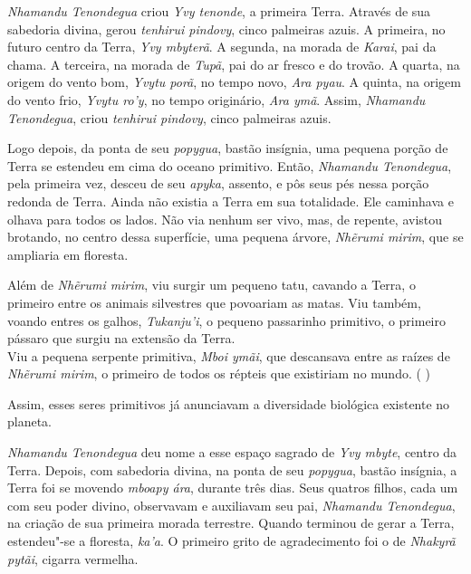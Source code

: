 

 

 



\emph{Nhamandu Tenondegua} criou \emph{Yvy tenonde}, a primeira Terra.
Através de sua sabedoria divina, gerou \emph{tenhirui pindovy}, cinco
palmeiras azuis. A primeira, no futuro centro da Terra, \emph{Yvy
mbyterã}. A segunda, na morada de \emph{Karai}, pai da chama. A terceira, na morada de \emph{Tupã}, pai do ar fresco e do trovão. A quarta, na origem do vento bom, \emph{Yvytu porã}, no tempo novo,
\emph{Ara pyau}. A quinta, na origem do vento frio, \emph{Yvytu ro'y},
no tempo originário, \emph{Ara ymã}. Assim, \emph{Nhamandu Tenondegua},
criou \emph{tenhirui pindovy}, cinco palmeiras azuis{.}

Logo depois, da ponta de seu \emph{popygua}, bastão insígnia, uma
pequena porção de Terra se estendeu em cima do oceano primitivo. Então,
\emph{Nhamandu Tenondegua}, pela primeira vez, desceu de seu
\emph{apyka}, assento, e pôs seus pés nessa porção redonda de Terra.
Ainda não existia a Terra em sua totalidade. Ele caminhava e olhava para
todos os lados. Não via nenhum ser vivo, mas, de repente, avistou
brotando, no centro dessa superfície, uma pequena árvore, \emph{Nhẽrumi
mirim}, que se ampliaria em floresta.




Além de \emph{Nhẽrumi mirim}, viu surgir um pequeno tatu, cavando a
Terra, o primeiro entre os animais silvestres que povoariam as matas.
Viu também, voando entres os galhos, \emph{Tukanju'i}, o pequeno
passarinho primitivo, o primeiro pássaro que surgiu na extensão da
Terra.\\ Viu a pequena serpente primitiva, \emph{Mboi ymãi}, que
descansava entre as raízes de \emph{Nhẽrumi mirim}, o primeiro de todos
os répteis que existiriam no mundo. %
( )

 

Assim, esses seres primitivos já anunciavam a diversidade biológica
existente no planeta.



\emph{Nhamandu Tenondegua} deu nome a esse espaço sagrado de \emph{Yvy
mbyte}, centro da Terra. Depois, com sabedoria divina, na ponta de seu
\emph{popygua}, bastão insígnia, a Terra foi se movendo \emph{mboapy
ára}, durante três dias. Seus quatros filhos, cada um com seu poder
divino, observavam e auxiliavam seu pai, \emph{Nhamandu Tenondegua}, na
criação de sua primeira morada terrestre. Quando terminou de gerar a
Terra, estendeu"-se a floresta, \emph{ka'a}. O primeiro grito de
agradecimento foi o de \emph{Nhakyrã pytãi}, cigarra vermelha.

